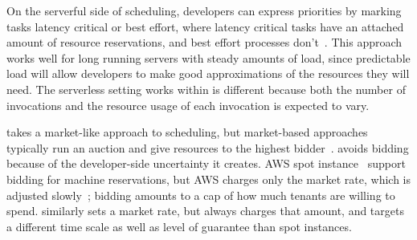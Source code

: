 On the serverful side of scheduling, developers can express priorities
by marking tasks latency critical or best effort, where latency
critical tasks have an attached amount of resource reservations, and
best effort processes don't~\cite{kubernetes-lc-be}.  This approach
works well for long running servers with steady amounts of load, since
predictable load will allow developers to make good approximations of
the resources they will need. The serverless setting \sys{} works
within is different because both the number of invocations and the
resource usage of each invocation is expected to vary.

\Sys{} takes a market-like approach to scheduling, but market-based
approaches typically run an auction and give resources to the highest
bidder~\cite{bellagio-market-based,online-auctioning}. \Sys{} avoids
bidding because of the developer-side uncertainty it creates. AWS spot
instance~\cite{spot-instance-pricing} support bidding for machine
reservations, but AWS charges only the market rate, which is adjusted
slowly~\cite{spot-instance-history}; bidding amounts to a cap of how
much tenants are willing to spend. \Sys{} similarly sets a market
rate, but always charges that amount, and targets a different time
scale as well as level of guarantee than spot instances.



